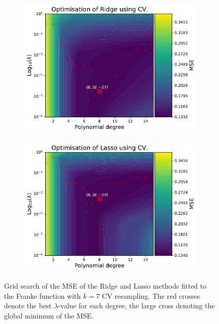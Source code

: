 \documentclass[twocolumn,english,notitlepage]{article}
\begin{document}
        \begin{figure}[ht]
            \begin{subfigure}{\linewidth}
                \centering
                \includegraphics[width=.9\linewidth]{heatmap_ridge.pdf}
            \end{subfigure}
            \begin{subfigure}{\linewidth}
                \centering
                \includegraphics[width=.9\linewidth]{heatmap_lasso.pdf}
            \end{subfigure}
            \caption{Grid search of the MSE of the Ridge and Lasso methods fitted to the Franke function with $k=7$ CV resampling. The red crosses denote the best $\lambda$-value for each degree, the large cross denoting the global minimum of the MSE.}
            \label{res:fig:Franke_heatmaps}
        \end{figure}
\end{document}
